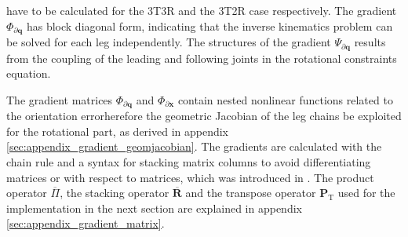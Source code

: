 \documentclass[robotics,article,accept,moreauthors,pdftex]{Definitions/mdpi}
\newcommand{\bm}[1]{\boldsymbol{#1}}
\newcommand{\transp}[0]{{\mathrm{T}}}
\let\Phi\varPhi
\let\Psi\varPsi
\begin{document}
%
have to be calculated for the 3T3R and the 3T2R case respectively.
The gradient $\bm{\Phi}_{\partial \bm{q}}$ has block diagonal form, indicating that the inverse kinematics problem can be solved for each leg independently.
The structures of the gradient $\bm{\Psi}_{\partial \bm{q}}$ results from the coupling of the leading and following joints in the rotational constraints equation.

The gradient matrices $\bm{\Phi}_{\partial \bm{q}}$ and $\bm{\Phi}_{\partial \bm{x}}$ contain nested nonlinear functions related to the orientation errorherefore\added[id=Sp]{,} the geometric Jacobian of the leg chains  be exploited for the rotational part, as derived in appendix\,\ref{sec:appendix_gradient_geomjacobian}.
The gradients are calculated with the chain rule and a syntax for stacking matrix columns to avoid differentiating matrices or with respect to matrices, which was introduced in \cite{1_SchapplerTapOrt2019}.
The product operator $\overline{\Pi}$, the stacking operator $\overline{\bm{R}}$ and the transpose operator $\bm{P}_\transp$ used for the implementation in the next section are explained in appendix\,\ref{sec:appendix_gradient_matrix}.
\end{document}
